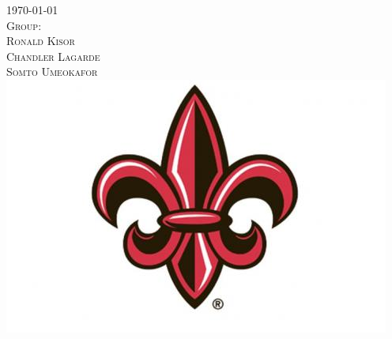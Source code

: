 \documentclass[12pt]{article}
\begin{document}
\begin{titlepage}


{\textsc{\large \today}}\\[0.5cm] %


\textsc{\large Group:}\\[0.1cm]
\textsc{Ronald Kisor}\\
\textsc{Chandler Lagarde}\\
\textsc{Somto Umeokafor}
\\[0.5cm]


\includegraphics[width=5in]{UL_logo.jpg}\\[1cm] %
 

\vfill %

\end{titlepage}
\end{document}
